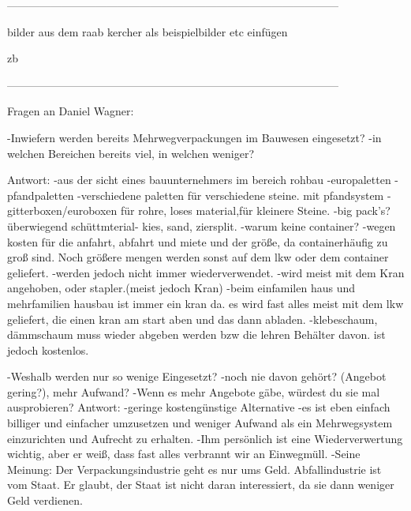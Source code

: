                 
------------------------------------------------------------------------------------------

bilder aus dem raab kercher als beispielbilder etc einfügen



\ac{zb}


------------------------------------------------------------------------------------------


Fragen an Daniel Wagner:


-Inwiefern werden bereits Mehrwegverpackungen im Bauwesen eingesetzt?
       -in welchen Bereichen bereits viel, in welchen weniger?
       
    Antwort:   
       -aus der sicht eines bauunternehmers im bereich rohbau
            -europaletten
            -pfandpaletten
            -verschiedene paletten für verschiedene steine. mit pfandsystem
            -gitterboxen/euroboxen für rohre, loses material,für kleinere Steine.
            -big pack's? überwiegend schüttmterial- kies, sand, ziersplit.
                -warum keine container?
                    -wegen kosten für die anfahrt, abfahrt und miete und der größe, da containerhäufig zu groß sind. Noch größere mengen werden sonst auf dem lkw oder dem container geliefert.
                -werden jedoch nicht immer wiederverwendet.
                -wird meist mit dem Kran angehoben, oder stapler.(meist jedoch Kran)
                    -beim einfamilen haus und mehrfamilien hausbau ist immer ein kran da. es wird fast alles meist mit dem lkw geliefert, die einen kran am start aben und das dann abladen.     
            -klebeschaum, dämmschaum muss wieder abgeben werden bzw die lehren Behälter davon. ist jedoch kostenlos. 
            
-Weshalb werden nur so wenige Eingesetzt? 
        -noch nie davon gehört? (Angebot gering?), mehr Aufwand?
                -Wenn es mehr Angebote gäbe, würdest du sie mal ausprobieren?
      Antwort:
        -geringe kostengünstige Alternative
                -es ist eben einfach billiger und einfacher umzusetzen und weniger Aufwand als ein Mehrwegsystem einzurichten und Aufrecht zu erhalten.
                -Ihm persönlich ist eine Wiederverwertung wichtig, aber er weiß, dass fast alles verbrannt wir an Einwegmüll.
                -Seine Meinung: Der Verpackungsindustrie geht es nur ums Geld. Abfallindustrie ist vom Staat. Er glaubt, der Staat ist nicht daran interessiert, da sie dann weniger Geld verdienen.
            

